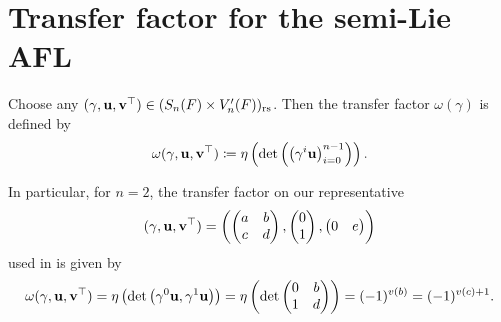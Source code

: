 \section{Transfer factor for the semi-Lie AFL}
\begin{definition}
  Choose any ${(\gamma, \mathbf u, \mathbf v^\top)} \in (S_n(F) \times V_n'(F))_{\mathrm{rs}}$.
  Then the transfer factor $\omega(\gamma)$ is defined by
  \[ \omega{(\gamma, \mathbf u, \mathbf v^\top)} \coloneqq
    \eta\left( \det\left( \left( \gamma^i \mathbf u \right)_{i=0}^{n-1} \right) \right).
  \]
\end{definition}

In particular, for $n = 2$, the transfer factor on our representative
\[ {(\gamma, \mathbf u, \mathbf v^\top)} = \left( \begin{pmatrix} a & b \\ c & d \end{pmatrix},
  \begin{pmatrix} 0 \\ 1 \end{pmatrix}, \begin{pmatrix} 0 & e \end{pmatrix} \right) \]
used in  is given by
\begin{equation}
    \omega{(\gamma, \mathbf u, \mathbf v^\top)}
    = \eta\left( \det
      \left( \gamma^0 \mathbf u, \gamma^1 \mathbf u \right)
    \right)
    = \eta\left( \det
      \begin{pmatrix} 0 & b \\ 1 & d \end{pmatrix}
    \right)
    = (-1)^{v(b)} = (-1)^{v(c)+1}.
  \label{eq:semi_lie_transfer}
\end{equation}
